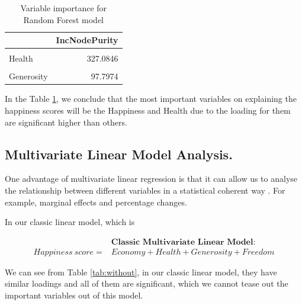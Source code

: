 \documentclass[11pt,a4paper,]{article}
\begin{document}
\newpage
\begin{table}

\caption{\label{tab:varimp}Variable importance for Random Forest model}
\centering
\begin{tabular}[t]{l|r}
\hline
  & IncNodePurity\\
\hline
\cellcolor{gray!6}{Economy} & \cellcolor{gray!6}{348.6690}\\
\hline
Health & 327.0846\\
\hline
\cellcolor{gray!6}{Freedom} & \cellcolor{gray!6}{169.3299}\\
\hline
Generosity & 97.7974\\
\hline
\end{tabular}
\end{table}

In the Table \ref{tab:varimp}, we conclude that the most important variables on explaining the happiness scores will be the Happiness and Health due to the loading for them are significant higher than others.

\hypertarget{multivariate-linear-model-analysis.}{%
\subsection{Multivariate Linear Model Analysis.}\label{multivariate-linear-model-analysis.}}

One advantage of multivariate linear regression is that it can allow us to analyse the relationship between different variables in a statistical coherent way \textcite{voxco2022}. For example, marginal effects and percentage changes.

In our classic linear model, which is

\[
\begin{aligned}
&\textbf{Classic Multivariate Linear Model}:\\
Happiness\ score=& Economy+Health+Generosity+Freedom
\end{aligned}
\]

We can see from Table \ref{tab:without}, in our classic linear model, they have similar loadings and all of them are significant, which we cannot tease out the important variables out of this model.
\end{document}
